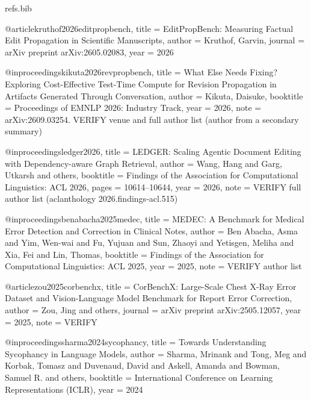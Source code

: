 \begin{filecontents*}[overwrite]{refs.bib}

@article{kruthof2026editpropbench,
  title   = {{EditPropBench}: Measuring Factual Edit Propagation in Scientific Manuscripts},
  author  = {Kruthof, Garvin},
  journal = {arXiv preprint arXiv:2605.02083},
  year    = {2026}
}

@inproceedings{kikuta2026revpropbench,
  title     = {What Else Needs Fixing? Exploring Cost-Effective Test-Time Compute for Revision Propagation in Artifacts Generated Through Conversation},
  author    = {Kikuta, Daisuke},
  booktitle = {Proceedings of EMNLP 2026: Industry Track},
  year      = {2026},
  note      = {arXiv:2609.03254. VERIFY venue and full author list (author from a secondary summary)}
}

@inproceedings{ledger2026,
  title     = {{LEDGER}: Scaling Agentic Document Editing with Dependency-aware Graph Retrieval},
  author    = {Wang, Hang and Garg, Utkarsh and others},
  booktitle = {Findings of the Association for Computational Linguistics: ACL 2026},
  pages     = {10614--10644},
  year      = {2026},
  note      = {VERIFY full author list (aclanthology 2026.findings-acl.515)}
}

@inproceedings{benabacha2025medec,
  title     = {{MEDEC}: A Benchmark for Medical Error Detection and Correction in Clinical Notes},
  author    = {Ben Abacha, Asma and Yim, Wen-wai and Fu, Yujuan and Sun, Zhaoyi and Yetisgen, Meliha and Xia, Fei and Lin, Thomas},
  booktitle = {Findings of the Association for Computational Linguistics: ACL 2025},
  year      = {2025},
  note      = {VERIFY author list}
}

@article{zou2025corbenchx,
  title   = {{CorBenchX}: Large-Scale Chest X-Ray Error Dataset and Vision-Language Model Benchmark for Report Error Correction},
  author  = {Zou, Jing and others},
  journal = {arXiv preprint arXiv:2505.12057},
  year    = {2025},
  note    = {VERIFY}
}

@inproceedings{sharma2024sycophancy,
  title     = {Towards Understanding Sycophancy in Language Models},
  author    = {Sharma, Mrinank and Tong, Meg and Korbak, Tomasz and Duvenaud, David and Askell, Amanda and Bowman, Samuel R. and others},
  booktitle = {International Conference on Learning Representations (ICLR)},
  year      = {2024}
}


\end{filecontents*}
